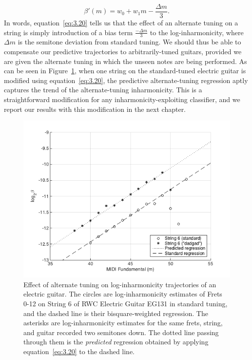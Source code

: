 \documentclass[12pt]{cmuthesis}
\begin{document}
\begin{equation}
\label{eq:3.20}
\beta'(m) = w_0 + w_1m - \frac{\Delta m}{3}.
\end{equation}
In words, equation~\eqref{eq:3.20} tells us that the effect of an alternate tuning on a string is simply introduction of a bias term $\frac{-\Delta m}{3}$ to the log-inharmonicity, where $\Delta m$ is the semitone deviation from standard tuning. We should thus be able to compensate our predictive trajectories to arbitrarily-tuned guitars, provided we are given the alternate tuning in which the unseen notes are being performed. As can be seen in Figure~\ref{fig:tuning-eg}, when one string on the standard-tuned electric guitar is modified using equation~\eqref{eq:3.20}, the predictive alternate-tuning regression aptly captures the trend of the alternate-tuning inharmonicity. This is a straightforward modification for any inharmonicity-exploiting classifier, and we report our results with this modification in the next chapter.
\begin{figure}[!htbp] 
\label{fig:tuning-eg}
\centering
\includegraphics[scale=0.75]{tuning-eg}
\caption{Effect of alternate tuning on log-inharmonicity trajectories of an electric guitar. The circles are log-inharmonicity estimates of Frets 0-12 on String 6 of RWC Electric Guitar EG131 in standard tuning, and the dashed line is their bisquare-weighted regression. The asterisks are log-inharmonicity estimates for the same frets, string, and guitar recorded two semitones down. The dotted line passing through them is the \textit{predicted} regression obtained by applying equation~\eqref{eq:3.20} to the dashed line.}
\end{figure}
\end{document}
